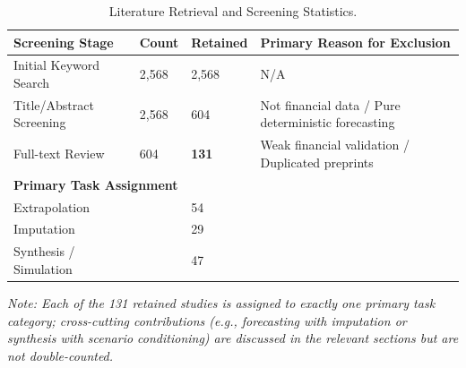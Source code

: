 \begin{table}[!ht]
\centering
\scriptsize
\caption{Literature Retrieval and Screening Statistics.}
\label{tab:retrieval_stats}
\begin{tabular}{p{5cm} p{2cm} p{2cm} p{3cm}}
\toprule
\textbf{Screening Stage} & \textbf{Count} & \textbf{Retained} & \textbf{Primary Reason for Exclusion} \\
\midrule
Initial Keyword Search & 2,568 & 2,568 & N/A \\
Title/Abstract Screening & 2,568 & 604 & Not financial data / Pure deterministic forecasting \\
Full-text Review & 604 & \textbf{131} & Weak financial validation / Duplicated preprints \\
\midrule
\multicolumn{4}{l}{\textbf{Primary Task Assignment}} \\
\quad Extrapolation & & 54 & \\
\quad Imputation & & 29 & \\
\quad Synthesis / Simulation & & 47 & \\
\bottomrule
\end{tabular}
\begin{flushleft}
\textit{Note: Each of the 131 retained studies is assigned to exactly one primary task category; cross-cutting contributions (e.g., forecasting with imputation or synthesis with scenario conditioning) are discussed in the relevant sections but are not double-counted.}
\end{flushleft}
\end{table}
